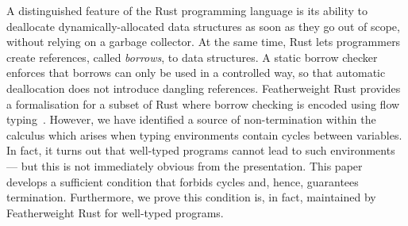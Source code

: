 A distinguished feature of the Rust programming language is its
ability to deallocate dynamically-allocated data structures as soon as
they go out of scope, without relying on a garbage collector. At the
same time, Rust lets programmers create references, called
\emph{borrows}, to data structures. A static borrow checker enforces
that borrows can only be used in a controlled way, so that automatic
deallocation does not introduce dangling references.  Featherweight
Rust provides a formalisation for a subset of Rust where borrow
checking is encoded using flow typing~\cite{Pearce21}.  However, we
have identified a source of non-termination within the calculus which
arises when typing environments contain cycles between variables.  In
fact, it turns out that well-typed programs cannot lead to such
environments --- but this is not immediately obvious from the
presentation.  This paper develops a sufficient condition that forbids
cycles and, hence, guarantees termination.  Furthermore, we prove this
condition is, in fact, maintained by Featherweight Rust for well-typed
programs.
